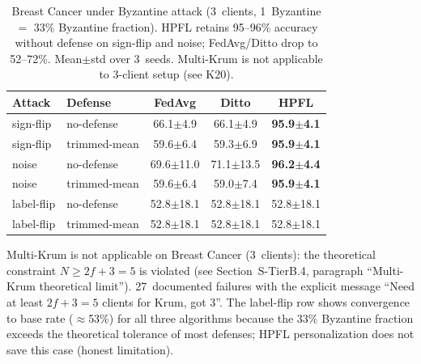 \documentclass[conference]{IEEEtran}
\begin{document}
\begin{table}[htbp]
\centering
\caption{Breast Cancer under Byzantine attack (3~clients, 1~Byzantine $=$ 33\% Byzantine fraction). HPFL retains 95--96\% accuracy without defense on sign-flip and noise; FedAvg/Ditto drop to 52--72\%. Mean$\pm$std over 3~seeds. Multi-Krum is not applicable to 3-client setup (see K20).}
\label{tab:tier_b_byz_bc}
\small
\setlength{\tabcolsep}{4pt}
\begin{tabular}{llccc}
\toprule
\textbf{Attack} & \textbf{Defense} & \textbf{FedAvg} & \textbf{Ditto} & \textbf{HPFL} \\
\midrule
sign-flip & no-defense & 66.1$\pm$4.9 & 66.1$\pm$4.9 & \textbf{95.9$\pm$4.1} \\
sign-flip & trimmed-mean & 59.6$\pm$6.4 & 59.3$\pm$6.9 & \textbf{95.9$\pm$4.1} \\
noise & no-defense & 69.6$\pm$11.0 & 71.1$\pm$13.5 & \textbf{96.2$\pm$4.4} \\
noise & trimmed-mean & 59.6$\pm$6.4 & 59.0$\pm$7.4 & \textbf{95.9$\pm$4.1} \\
label-flip & no-defense & 52.8$\pm$18.1 & 52.8$\pm$18.1 & 52.8$\pm$18.1 \\
label-flip & trimmed-mean & 52.8$\pm$18.1 & 52.8$\pm$18.1 & 52.8$\pm$18.1 \\
\bottomrule
\end{tabular}

\vspace{1mm}
\footnotesize{Multi-Krum is not applicable on Breast Cancer (3~clients): the theoretical constraint $N{\geq}2f{+}3{=}5$ is violated (see Section~S-TierB.4, paragraph ``Multi-Krum theoretical limit''). 27~documented failures with the explicit message ``Need at least $2f{+}3{=}5$ clients for Krum, got 3''. The label-flip row shows convergence to base rate ($\approx$53\%) for all three algorithms because the 33\% Byzantine fraction exceeds the theoretical tolerance of most defenses; HPFL personalization does not save this case (honest limitation).}
\end{table}
\end{document}
